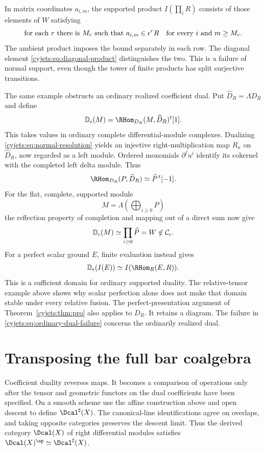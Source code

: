 In matrix coordinates $a_{i,m}$, the supported product
$I(\prod_iR)$ consists of those elements of $W$ satisfying
\[
 \text{for each }r\text{ there is }M_r\text{ such that }
 a_{i,m}\in\epsilon^rR\quad\text{for every }i\text{ and }m\geq M_r.
\]
The ambient product imposes the bound separately in each row.
The diagonal element \eqref{cyjets:eq:diagonal-product} distinguishes
the two. This is a failure of normal support, even though the tower
of finite products has split surjective transitions.

The same example obstructs an ordinary realized coefficient dual.
Put $\widehat D_R=\Lambda D_R$ and define
\[
 \mathbb D_\eps(M)=\RHom_{D_R}(M,\widehat D_R)^t[1].
\]
This takes values in ordinary complete differential-module complexes.
Dualizing \eqref{cyjets:eq:normal-resolution} yields an injective
right-multiplication map $R_u$ on $\widehat D_R$, now regarded as
a left module. Ordered monomials $\partial^ju^i$ identify its
cokernel with the completed left delta module. Thus
\[
 \RHom_{D_R}(P,\widehat D_R)\simeq\widehat P^{\,t}[-1].
\]
For the flat, complete, supported module
\[
 M=\Lambda\left(\bigoplus_{i\geq0}P\right)
\]
the reflection property of completion and mapping out of a direct
sum now give
\begin{equation}\label{cyjets:eq:ordinary-dual-failure}
 \mathbb D_\epsilon(M)\simeq\prod_{i\geq0}\widehat P=W
                       \notin\mathcal C_\epsilon.
\end{equation}
For a perfect scalar ground $E$, finite evaluation instead gives
\[
 \mathbb D_\eps(I(E))\simeq I(\RHom_R(E,R)).
\]
This is a sufficient domain for ordinary supported duality. The
relative-tensor example above shows why scalar perfection alone
does not make that domain stable under every relative fusion.
The perfect-presentation argument of Theorem~\ref{cyjets:thm:pro}
also applies to $D_R$. It retains a diagram. The failure in
\eqref{cyjets:eq:ordinary-dual-failure} concerns the ordinarily realized dual.

\section{Transposing the full bar coalgebra}
\label{cyjets:sec:bar}

Coefficient duality reverses maps. It becomes a comparison of
operations only after the tensor and geometric functors on the
dual coefficients have been specified. On a smooth scheme use
the affine construction above and open descent to define
$\Dcal^\sharp(X)$. The canonical-line identifications agree on
overlaps, and taking opposite categories preserves the descent
limit. Thus the derived category $\Dcal(X)$ of right differential
modules satisfies
$\Dcal(X)^{\op}\simeq\Dcal^\sharp(X)$.

